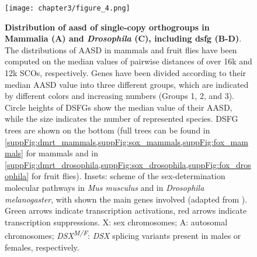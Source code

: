 \begingroup
{}
\begin{figure}
	\centering
	\texttt{[image: chapter3/figure\_4.png]}
	\captionsetup[subfigure]{labelformat=nocaption}
	\begin{subfigure}{0\linewidth}
	\caption{}\label{fig:DSFG_testDivergence-A}
	\end{subfigure}%
	\begin{subfigure}{0\linewidth}
	\caption{}\label{fig:DSFG_testDivergence-B}
	\end{subfigure}%
	\begin{subfigure}{0\linewidth}
	\caption{}\label{fig:DSFG_testDivergence-C}
	\end{subfigure}%
	\begin{subfigure}{0\linewidth}
	\caption{}\label{fig:DSFG_testDivergence-D}
	\end{subfigure}
	\caption[\textbf{Distribution of \gls{aasd} of single-copy orthogroups in Mammalia (A) and \textit{Drosophila} (C), including \gls{dsfg} (B-D)}]
	{
		\textbf{Distribution of \gls{aasd} of single-copy orthogroups in Mammalia (A) and \textit{Drosophila} (C), including \gls{dsfg} (B-D)}. The distributions of AASD in mammals and fruit flies have been computed on the median values of pairwise distances of over 16k and 12k SCOs, respectively. Genes have been divided according to their median AASD value into three different groups, which are indicated by different colors and increasing numbers (Groups 1, 2, and 3). Circle heights of DSFGs show the median value of their AASD, while the size indicates the number of represented species. DSFG trees are shown on the bottom (full trees can be found in \cref{suppFig:dmrt_mammals,suppFig:sox_mammals,suppFig:fox_mammals} for mammals and in \cref{suppFig:dmrt_drosophila,suppFig:sox_drosophila,suppFig:fox_drosophila} for fruit flies). Insets: scheme of the sex-determination molecular pathways in \textit{Mus musculus} and in \textit{Drosophila melanogaster}, with shown the main genes involved (adapted from ). Green arrows indicate transcription activations, red arrows indicate transcription suppressions. X: sex chromosomes; A: autosomal chromosomes; \textit{DSX\textsuperscript{M/F}}: \textit{DSX} splicing variants present in males or females, respectively.
	}
	\label{fig:DSFG_testDivergence}
\end{figure}
\endgroup

